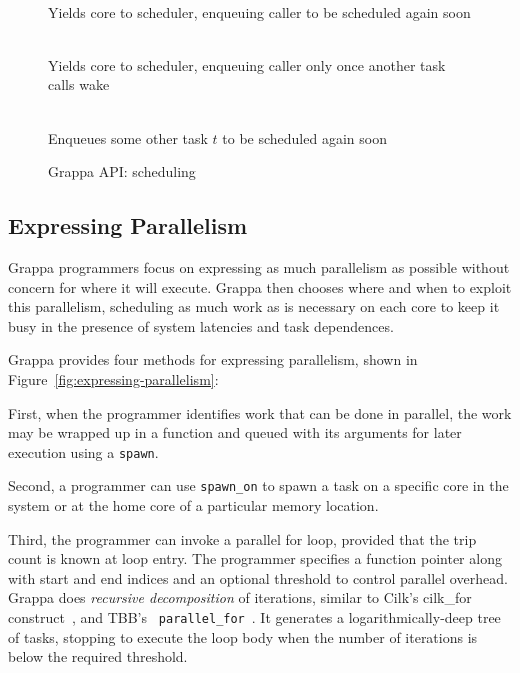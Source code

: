 \begin{figure}[htbp]
  \begin{center}
    \begin{description}\small
    \item[ \texttt{ yield() } ] \hfill \\
      Yields core to scheduler, enqueuing caller to be scheduled again soon
    \item[ \texttt{ suspend() } ] \hfill \\
      Yields core to scheduler, enqueuing caller only once another task calls wake
    \item[ \texttt{ wake( task * $t$ ) } ] \hfill \\
      Enqueues some other task $t$ to be scheduled again soon
    \end{description}
    \begin{minipage}{0.95\columnwidth}
      \caption{\label{fig:scheduling} Grappa API: scheduling} %
    \end{minipage}
  \end{center}
\end{figure}


\subsection{Expressing Parallelism}

Grappa programmers focus on expressing as much
parallelism as possible without concern for where it will execute.
Grappa then chooses where and when to exploit this parallelism,
scheduling as much work as is necessary on each core to keep it busy
in the presence of system latencies and task dependences.

Grappa provides four methods for expressing parallelism, shown in
Figure~\ref{fig:expressing-parallelism}:

First, when the programmer identifies work
that can be done in parallel, the work may be wrapped up in a function
and queued with its arguments for later execution using a
\texttt{spawn}.

Second, a programmer can use \texttt{spawn\_on} to spawn a task on a
specific core in the system or at the home core of a particular memory
location.

Third, the programmer can invoke a parallel for loop, provided that the trip
count is known at loop entry. The programmer specifies a function pointer
along with start and end indices and an optional threshold to control parallel
overhead. Grappa does {\em recursive decomposition} of iterations, similar to
Cilk's cilk\_for construct~\cite {cilkforimplementation}, and TBB's {\tt
parallel\_for}~\cite{intel_tbb}. It generates a logarithmically-deep tree of
tasks, stopping to execute the loop body when the number of iterations is
below the required threshold.

